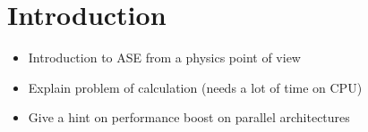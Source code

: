 \section{Introduction}

\begin{itemize}

  \item Introduction to ASE from a physics point of view

  \item Explain problem of calculation (needs a lot of time on CPU)

  \item Give a hint on performance boost on parallel architectures

\end{itemize}
